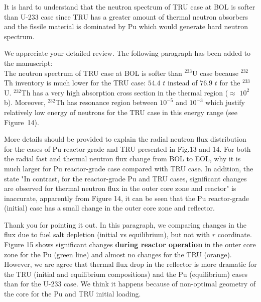 \documentclass[answers,11pt]{exam}
\begin{document}
\begin{questions}
\begin{solution}
        \end{solution}

        \question It is hard to understand that the neutron spectrum of TRU case at BOL is softer than U-233 case since TRU has a greater amount of thermal neutron absorbers and the fissile material is dominated by Pu which would generate hard neutron spectrum.
        
        \begin{solution}
                 We appreciate your detailed review.                   
                 The following paragraph has been added to the manuscript:\\
                 
                 The neutron spectrum of TRU case at BOL is softer than $^{233}$U case because $^{232}$Th inventory is much lower for the TRU case: $54.4$ $t$ instead of $76.9$ $t$ for the $^{233}$U. $^{232}$Th has a very high absorption cross section in the thermal region ($\approx$ $10^2$ b). Moreover, $^{232}$Th has resonance region between $10^{-5}$ and $10^{-3}$ which justify relatively low energy of neutrons for the TRU case in this energy range (see Figure~14). 
                 
        \end{solution}

        \question More details should be provided to explain the radial 
        neutron flux distribution for the cases of Pu reactor-grade and TRU 
        presented in Fig.13 and 14. For both the radial fast and thermal 
        neutron flux change from BOL to EOL, why it is much larger for Pu 
        reactor-grade case compared with TRU case. In addition, the state "In 
        contrast, for the reactor-grade Pu and TRU cases, significant changes 
        are observed for thermal neutron flux in the outer core zone and 
        reactor" is inaccurate, apparently from Figure 14, it can be seen that 
        the Pu reactor-grade (initial) case has a small change in the outer 
        core zone and reflector. 
        \begin{solution}
				Thank you for pointing it out. In this paragraph, we comparing 
				changes in the flux due to fuel salt depletion (initial vs 
				equilibrium), but not with $r$ coordinate. Figure 15 shows 
				significant changes \textbf{during reactor operation} in the 
				outer core zone for the Pu (green line) and almost no changes 
				for the TRU (orange). However, we are agree that thermal flux 
				drop in the reflector is more dramatic for the TRU (initial 
				and equilibrium compositions) and the Pu (equilibrium) cases 
				than for the U-233 case. We think it happens because of 
				non-optimal geometry of the core for the Pu and TRU initial 
				loading.			
				

\end{solution}
\end{questions}
\end{document}
